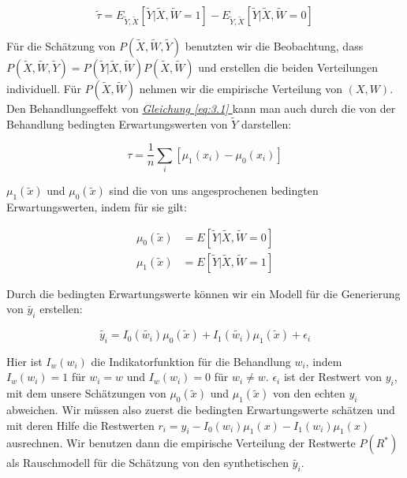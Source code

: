 \documentclass[12pt,a4paper,twoside]{scrartcl}
\numberwithin{equation}{section}
\renewcommand*{\refeq}[1]{\emph{\hyperref[#1]{Gleichung \ref*{#1} }}}
\begin{document}
\begin{equation}\label{eq:3.1}
  \tilde{\tau} = E_{\widetilde{Y},\widetilde{X}}[\widetilde{Y}|\widetilde{X},\widetilde{W} = 1] - E_{\widetilde{Y},\widetilde{X}}[\widetilde{Y}|\widetilde{X},\widetilde{W} = 0]
\end{equation} 

\noindent
Für die Schätzung von $P(\widetilde{X},\widetilde{W},\widetilde{Y})$ benutzten wir die Beobachtung, dass $P(\widetilde{X},\widetilde{W},\widetilde{Y}) = P(\widetilde{Y}|\widetilde{X},\widetilde{W})P(\widetilde{X},\widetilde{W})$ und erstellen die beiden Verteilungen individuell. Für $P(\widetilde{X},\widetilde{W})$ nehmen wir die empirische Verteilung von $(X,W)$. Den Behandlungseffekt von \refeq{eq:3.1} kann man auch durch die von der Behandlung bedingten Erwartungswerten von $\widetilde{Y}$ darstellen\cite{schuler2017synth}:\par 

\begin{equation}\label{eq:3.2}
 \tau = \frac{1}{n}\sum_i[\mu_1(x_i)-\mu_0(x_i)]
\end{equation}

\noindent
$\mu_1(\tilde{x})$ und $\mu_0(\tilde{x})$ sind die von uns angesprochenen bedingten Erwartungswerten, indem für sie gilt:

\begin{equation}\label{eq:3.3}
\begin{split}
\mu_0(\tilde{x}) &= E[\widetilde{Y}|\widetilde{X},\widetilde{W} = 0]\\
\mu_1(\tilde{x}) &= E[\widetilde{Y}|\widetilde{X},\widetilde{W} = 1]
\end{split}
\end{equation}

\noindent
Durch die bedingten Erwartungswerte können wir ein Modell für die Generierung von $\tilde{y_i}$ erstellen:\par

\begin{equation}\label{eq:3.4}
 \tilde{y_i} = I_0(\tilde{w_i})\mu_0(\tilde{x}) + I_1(\tilde{w_i})\mu_1(\tilde{x}) + \epsilon_i
\end{equation}

\noindent
Hier ist $I_w(w_i)$ die Indikatorfunktion für die Behandlung $w_i$, indem $I_w(w_i) = 1$ für $w_i = w$ und $I_w(w_i) = 0$ für $w_i \neq w$. $\epsilon_i$ ist der Restwert von $y_i$, mit dem unsere Schätzungen von $\mu_0(\tilde{x})$ und $\mu_1(\tilde{x})$ von den echten $y_i$ abweichen. Wir müssen also zuerst die bedingten Erwartungswerte schätzen und mit deren Hilfe die Restwerten $r_i = y_i - I_0(w_i)\mu_1(x) - I_1(w_i)\mu_1(x)$ ausrechnen. Wir benutzen dann die empirische Verteilung der Restwerte $P(R^*)$ als Rauschmodell für die Schätzung von den synthetischen $\tilde{y_i}$\cite{schuler2017synth}.\par 
\end{document}
